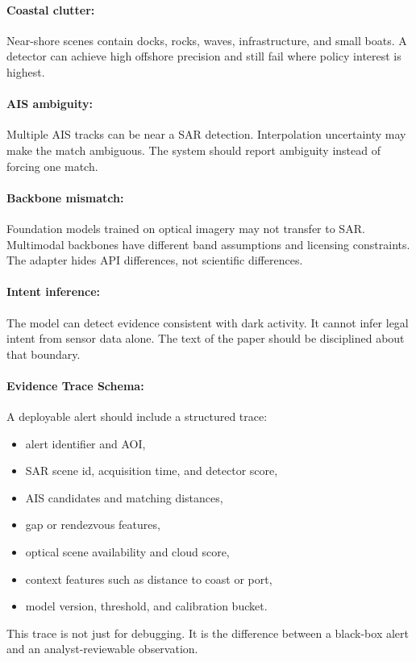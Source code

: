 \documentclass{article}
\begin{document}
\paragraph{Coastal clutter:}
Near-shore scenes contain docks, rocks, waves, infrastructure, and small boats. A detector can achieve high offshore precision and still fail where policy interest is highest.

\paragraph{AIS ambiguity:}
Multiple AIS tracks can be near a SAR detection. Interpolation uncertainty may make the match ambiguous. The system should report ambiguity instead of forcing one match.

\paragraph{Backbone mismatch:}
Foundation models trained on optical imagery may not transfer to SAR. Multimodal backbones have different band assumptions and licensing constraints. The adapter hides API differences, not scientific differences.

\paragraph{Intent inference:}
The model can detect evidence consistent with dark activity. It cannot infer legal intent from sensor data alone. The text of the paper should be disciplined about that boundary.

\paragraph{Evidence Trace Schema:}

A deployable alert should include a structured trace:
\begin{itemize}
  \item alert identifier and AOI,
  \item SAR scene id, acquisition time, and detector score,
  \item AIS candidates and matching distances,
  \item gap or rendezvous features,
  \item optical scene availability and cloud score,
  \item context features such as distance to coast or port,
  \item model version, threshold, and calibration bucket.
\end{itemize}
This trace is not just for debugging. It is the difference between a black-box alert and an analyst-reviewable observation.
\end{document}
